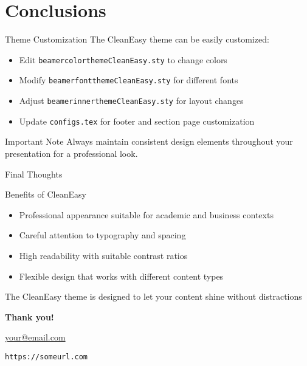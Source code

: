 \documentclass[aspectratio=169,xcolor=dvipsnames]{beamer}
\begin{document}
\section{Conclusions}
\begin{frame}{Theme Customization}
  The CleanEasy theme can be easily customized:
  
  \begin{itemize}
    \item Edit \texttt{beamercolorthemeCleanEasy.sty} to change colors
    \item Modify \texttt{beamerfontthemeCleanEasy.sty} for different fonts
    \item Adjust \texttt{beamerinnerthemeCleanEasy.sty} for layout changes
    \item Update \texttt{configs.tex} for footer and section page customization
  \end{itemize}
  
  \begin{alertblock}{Important Note}
    Always maintain consistent design elements throughout your presentation for a professional look.
  \end{alertblock}
\end{frame}

\begin{frame}{Final Thoughts}
  \begin{block}{Benefits of CleanEasy}
    \begin{itemize}
      \item Professional appearance suitable for academic and business contexts
      \item Careful attention to typography and spacing
      \item High readability with suitable contrast ratios
      \item Flexible design that works with different content types
    \end{itemize}
  \end{block}
  
  \vspace{0.5cm}
  
  \begin{center}
    \large{The CleanEasy theme is designed to let your content shine without distractions}
  \end{center}
\end{frame}

\begin{frame}[plain]
  \centering
  \Huge \textbf{Thank you!}
  
  \vspace{1cm}
  \normalsize
  \href{mailto:your@email.com}{your@email.com}
  
  \vspace{0.5cm}
  \small
  \texttt{https://someurl.com}
\end{frame}
\end{document}
